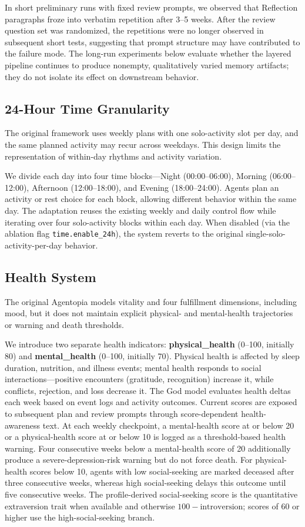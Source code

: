 \documentclass[11pt]{article}
\begin{document}
In short preliminary runs with fixed review prompts, we observed that Reflection paragraphs froze into verbatim repetition after 3--5 weeks.
After the review question set was randomized, the repetitions were no longer observed in subsequent short tests, suggesting that prompt structure may have contributed to the failure mode.
The long-run experiments below evaluate whether the layered pipeline continues to produce nonempty, qualitatively varied memory artifacts; they do not isolate its effect on downstream behavior.

\subsection{24-Hour Time Granularity}

The original framework uses weekly plans with one solo-activity slot per day, and the same planned activity may recur across weekdays.
This design limits the representation of within-day rhythms and activity variation.

We divide each day into four time blocks---Night (00:00--06:00), Morning (06:00--12:00), Afternoon (12:00--18:00), and Evening (18:00--24:00).
Agents plan an activity or rest choice for each block, allowing different behavior within the same day.
The adaptation reuses the existing weekly and daily control flow while iterating over four solo-activity blocks within each day.
When disabled (via the ablation flag \texttt{time.enable\_24h}), the system reverts to the original single-solo-activity-per-day behavior.

\subsection{Health System}

The original Agentopia models vitality and four fulfillment dimensions, including mood, but it does not maintain explicit physical- and mental-health trajectories or warning and death thresholds.

We introduce two separate health indicators: \textbf{physical\_health} (0--100, initially 80) and \textbf{mental\_health} (0--100, initially 70).
Physical health is affected by sleep duration, nutrition, and illness events; mental health responds to social interactions---positive encounters (gratitude, recognition) increase it, while conflicts, rejection, and loss decrease it.
The God model evaluates health deltas each week based on event logs and activity outcomes.
Current scores are exposed to subsequent plan and review prompts through score-dependent health-awareness text.
At each weekly checkpoint, a mental-health score at or below 20 or a physical-health score at or below 10 is logged as a threshold-based health warning.
Four consecutive weeks below a mental-health score of 20 additionally produce a severe-depression-risk warning but do not force death.
For physical-health scores below 10, agents with low social-seeking are marked deceased after three consecutive weeks, whereas high social-seeking delays this outcome until five consecutive weeks.
The profile-derived social-seeking score is the quantitative extraversion trait when available and otherwise $100-\text{introversion}$; scores of 60 or higher use the high-social-seeking branch.
\end{document}
